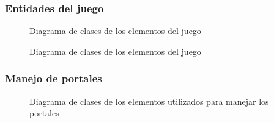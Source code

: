 \documentclass[a4paper]{article}
\begin{document}
\newpage 

\subsubsection{Entidades del juego}

\begin{figure}[!h]
	\caption{Diagrama de clases de los elementos del juego}
	\label{fig:diagrama1}
\end{figure}

\begin{figure}[!h]
	\caption{Diagrama de clases de los elementos del juego}
	\label{fig:diagrama2}
\end{figure}

\newpage
\subsubsection{Manejo de portales}

\begin{figure}[!h]
	\caption{Diagrama de clases de los elementos utilizados para manejar los portales}
	\label{fig:diagrama3}
\end{figure}
\end{document}
